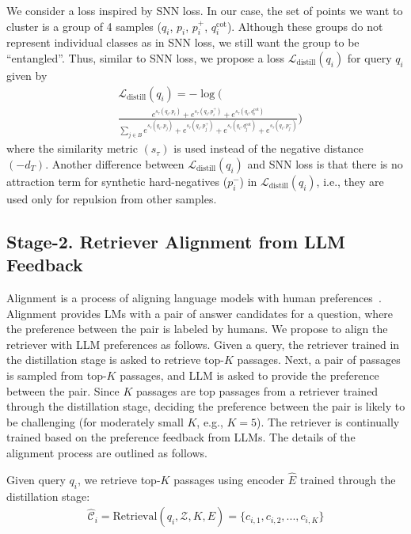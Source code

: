 We consider a loss inspired by SNN loss. In our case, the set of points we want to cluster is a group of 4 samples ($q_i$, $p_i$, $p_i^+$, $q^\mathrm{cot}_i$). Although these groups do not represent individual classes as in SNN loss, we still want the group to be ``entangled''. Thus, similar to SNN loss, we propose a loss $\mathcal{L}_\mathrm{distill}(q_i)$ for query $q_i$ 
given by
\begin{align*}
&\mathcal{L}_\mathrm{distill}(q_i) =-\log\big(\\&  \frac{e^{s_{\tau}(q_i, p_i)}+e^{s_{\tau}(q_i, p^+_i)}+e^{s_{\tau}(q_i, q^\mathrm{cot}_i)}}
{\sum\limits_{j\in B} e^{s_{\tau}(q_i, p_j)}+e^{s_{\tau}(q_i, p^+_j)}+e^{s_{\tau}(q_i, q^\mathrm{cot}_j)}+e^{s_{\tau}(q_i, p^-_j)}}\bigg)
\end{align*}
where the similarity metric $(s_\tau)$ is used instead of the negative distance $(-d_T)$.
Another difference between $\mathcal{L}_\mathrm{distill}(q_i)$ and SNN loss is that there is no attraction term for synthetic hard-negatives ($p_i^-$) in $\mathcal{L}_\mathrm{distill}(q_i)$, i.e., they are used only for repulsion from other samples. 
\subsection{Stage-2. Retriever Alignment from LLM Feedback}\label{stage2}

Alignment is a process of aligning language models with human preferences~\cite{ouyang2022training, rafailov2024direct}. Alignment provides LMs with a pair of answer candidates for a question, where the preference between the pair is labeled by humans. We propose to align the retriever with LLM preferences as follows. Given a query, the retriever trained in the distillation stage is asked to retrieve top-$K$ passages. Next, a pair of passages is sampled from top-$K$ passages, and LLM is asked to provide the preference between the pair. Since $K$ passages are top passages from a retriever trained through the distillation stage, deciding the preference between the pair is likely to be challenging (for moderately small $K$, e.g., $K=5$). The retriever is continually trained based on the preference feedback from LLMs. The details of the alignment process are outlined as follows.

 Given query $q_i$, we retrieve top-$K$ passages using encoder $\hat{E}$ trained through the distillation stage:
\begin{align*}
    \hat{\mathcal{C}}_i = \mathrm{Retrieval}(q_i, \mathcal{Z}, K, \hat{E}) = \{c_{i,1}, c_{i,2}, ..., c_{i,K}\}
\end{align*}

